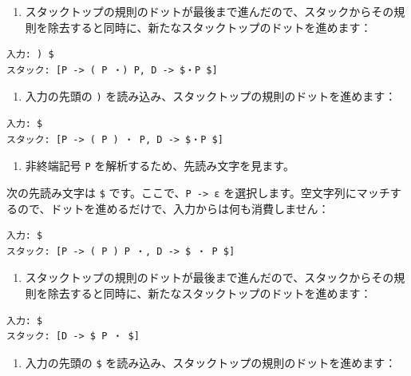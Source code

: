 \begin{enumerate}
\def\labelenumi{\arabic{enumi}.}
\setcounter{enumi}{8}
\tightlist
\item
  スタックトップの規則のドットが最後まで進んだので、スタックからその規則を除去すると同時に、新たなスタックトップのドットを進めます：
\end{enumerate}

\begin{verbatim}
入力: ) $
スタック: [P -> ( P ・) P, D -> $・P $]
\end{verbatim}

\begin{enumerate}
\def\labelenumi{\arabic{enumi}.}
\setcounter{enumi}{9}
\tightlist
\item
  入力の先頭の \texttt{)}
  を読み込み、スタックトップの規則のドットを進めます：
\end{enumerate}

\begin{verbatim}
入力: $
スタック: [P -> ( P ) ・ P, D -> $・P $]
\end{verbatim}

\begin{enumerate}
\def\labelenumi{\arabic{enumi}.}
\setcounter{enumi}{10}
\tightlist
\item
  非終端記号 \texttt{P} を解析するため、先読み文字を見ます。
\end{enumerate}

次の先読み文字は \texttt{\$}
です。ここで、\texttt{P\ -\textgreater{}\ ε}
を選択します。空文字列にマッチするので、ドットを進めるだけで、入力からは何も消費しません：

\begin{verbatim}
入力: $
スタック: [P -> ( P ) P ・, D -> $ ・ P $]
\end{verbatim}

\begin{enumerate}
\def\labelenumi{\arabic{enumi}.}
\setcounter{enumi}{11}
\tightlist
\item
  スタックトップの規則のドットが最後まで進んだので、スタックからその規則を除去すると同時に、新たなスタックトップのドットを進めます：
\end{enumerate}

\begin{verbatim}
入力: $
スタック: [D -> $ P ・ $]
\end{verbatim}

\begin{enumerate}
\def\labelenumi{\arabic{enumi}.}
\setcounter{enumi}{12}
\tightlist
\item
  入力の先頭の \texttt{\$}
  を読み込み、スタックトップの規則のドットを進めます：
\end{enumerate}

